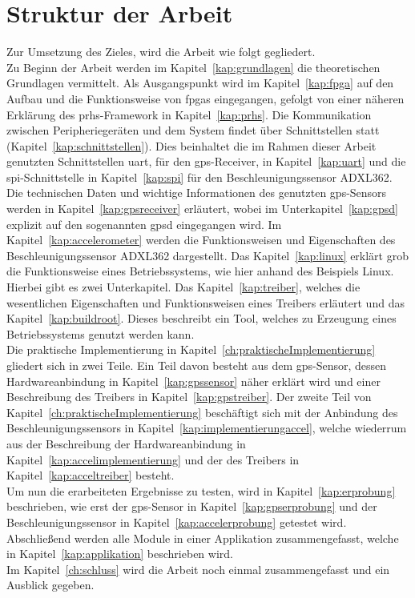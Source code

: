 \section{Struktur der Arbeit}\label{kap:strukturderarbeit}

Zur Umsetzung des Zieles, wird die Arbeit wie folgt gegliedert.\\
Zu Beginn der Arbeit werden im Kapitel~\ref{kap:grundlagen} die theoretischen Grundlagen vermittelt. Als
Ausgangspunkt wird im Kapitel~\ref{kap:fpga} auf den Aufbau und die Funktionsweise von \acp{fpga} eingegangen,
gefolgt von einer näheren Erklärung des \ac{prhs}-Framework in Kapitel~\ref{kap:prhs}. Die Kommunikation zwischen
Peripheriegeräten und dem System findet über Schnittstellen statt (Kapitel~\ref{kap:schnittstellen}).
 Dies beinhaltet die im Rahmen dieser Arbeit genutzten Schnittstellen \ac{uart}, für den \ac{gps}-Receiver, in Kapitel~\ref{kap:uart}
  und die \ac{spi}-Schnittstelle in Kapitel~\ref{kap:spi} für den Beschleunigungssensor ADXL362.
Die technischen Daten und wichtige Informationen des genutzten \ac{gps}-Sensors werden in
Kapitel~\ref{kap:gpsreceiver} erläutert, wobei im Unterkapitel~\ref{kap:gpsd} explizit auf den
sogenannten \ac{gpsd} eingegangen wird. Im Kapitel~\ref{kap:accelerometer} werden die Funktionsweisen und
Eigenschaften des Beschleunigungssensor ADXL362 dargestellt. Das Kapitel~\ref{kap:linux} erklärt grob die
Funktionsweise eines Betriebssystems, wie hier anhand des Beispiels Linux. Hierbei gibt es zwei Unterkapitel.
Das Kapitel~\ref{kap:treiber}, welches die wesentlichen Eigenschaften und Funktionsweisen
eines Treibers erläutert und das Kapitel~\ref{kap:buildroot}. Dieses beschreibt ein Tool, welches zu Erzeugung
eines Betriebssystems genutzt werden kann.\\
Die praktische Implementierung in Kapitel~\ref{ch:praktischeImplementierung} gliedert sich in zwei Teile.
Ein Teil davon besteht aus dem \ac{gps}-Sensor, dessen Hardwareanbindung in Kapitel~\ref{kap:gpssensor} näher
erklärt wird und einer Beschreibung des Treibers in Kapitel~\ref{kap:gpstreiber}. Der zweite Teil von Kapitel~\ref{ch:praktischeImplementierung}
 beschäftigt sich mit der Anbindung des Beschleunigungssensors in Kapitel~\ref{kap:implementierungaccel}, welche wiederrum aus
der Beschreibung der Hardwareanbindung in Kapitel~\ref{kap:accelimplementierung} und der des Treibers
in Kapitel~\ref{kap:acceltreiber} besteht. \\
Um nun die erarbeiteten Ergebnisse zu testen, wird in Kapitel~\ref{kap:erprobung} beschrieben, wie erst
der \ac{gps}-Sensor in Kapitel~\ref{kap:gpserprobung} und der Beschleunigungssensor in Kapitel~\ref{kap:accelerprobung} getestet wird.
Abschließend werden alle Module in einer Applikation zusammengefasst,
welche in Kapitel~\ref{kap:applikation} beschrieben wird.\\
Im Kapitel~\ref{ch:schluss} wird die Arbeit noch einmal zusammengefasst und ein Ausblick gegeben.\\
